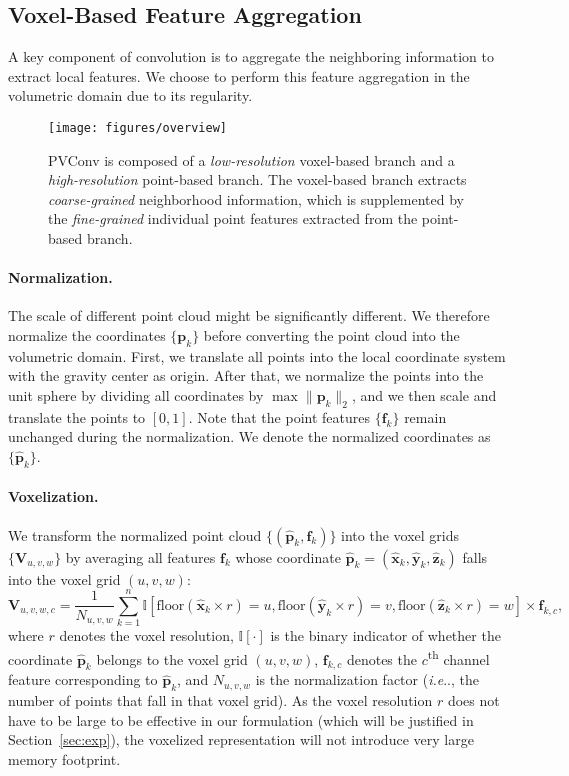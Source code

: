 \documentclass{article}
\makeatletter
\newcommand{\sect}[1]{Section~\ref{#1}}
\newcommand{\norm}[1]{\lVert#1\rVert}
\DeclareRobustCommand\onedot{\futurelet\@let@token\@onedot}
\def\@onedot{\ifx\@let@token.\else.\null\fi\xspace}
\def\ie{\emph{i.e}\onedot} \def\Ie{\emph{I.e}\onedot}
\newcommand{\myparagraph}[1]{\vspace{-6pt}\paragraph{#1}}
\def\convshort{PVConv\xspace}
\makeatother
\begin{document}
\subsection{Voxel-Based Feature Aggregation}

A key component of convolution is to aggregate the neighboring information to extract local features. We choose to perform this feature aggregation in the volumetric domain due to its regularity.

\begin{figure}[t]
\centering
\texttt{[image: figures/overview]}
\caption{\convshort is composed of a \emph{low-resolution} voxel-based branch and a \emph{high-resolution} point-based branch. The voxel-based branch extracts \emph{coarse-grained} neighborhood information, which is supplemented by the \emph{fine-grained} individual point features extracted from the point-based branch.}
\vspace{-10pt}
\label{fig:overview}
\end{figure} 
\myparagraph{Normalization.}

The scale of different point cloud might be significantly different. We therefore normalize the coordinates $\{\bm{p}_k\}$ before converting the point cloud into the volumetric domain. First, we translate all points into the local coordinate system with the gravity center as origin. After that, we normalize the points into the unit sphere by dividing all coordinates by $\max\norm{\bm{p}_k}_2$, and we then scale and translate the points to $[0, 1]$. Note that the point features $\{\bm{f}_k\}$ remain unchanged during the normalization. We denote the normalized coordinates as $\{\hat{\bm{p}}_k\}$.

\myparagraph{Voxelization.}

We transform the normalized point cloud $\{(\hat{\bm{p}}_k, \bm{f}_k)\}$ into the voxel grids $\{\bm{V}_{u, v, w}\}$ by averaging all features $\bm{f}_k$ whose coordinate $\hat{\bm{p}}_k = (\hat{\bm{x}}_k, \hat{\bm{y}}_k, \hat{\bm{z}}_k)$ falls into the voxel grid $(u, v, w)$:
\begin{equation}
    \bm{V}_{u, v, w, c} = \frac{1}{N_{u, v, w}} \sum_{k=1}^n \mathbb{I}[\text{floor}(\hat{\bm{x}}_k \times r) = u, \text{floor}(\hat{\bm{y}}_k \times r) = v, \text{floor}(\hat{\bm{z}}_k \times r) = w] \times \bm{f}_{k,c},
\label{equ:vox}
\end{equation}
where $r$ denotes the voxel resolution, $\mathbb{I}[\cdot]$ is the binary indicator of whether the coordinate $\hat{\bm{p}}_k$ belongs to the voxel grid $(u, v, w)$, $\bm{f}_{k,c}$ denotes the $c$\textsuperscript{th} channel feature corresponding to $\hat{\bm{p}}_k$, and $N_{u,v,w}$ is the normalization factor (\ie, the number of points that fall in that voxel grid). As the voxel resolution $r$ does not have to be large to be effective in our formulation (which will be justified in \sect{sec:exp}), the voxelized representation will not introduce very large memory footprint.
\end{document}
